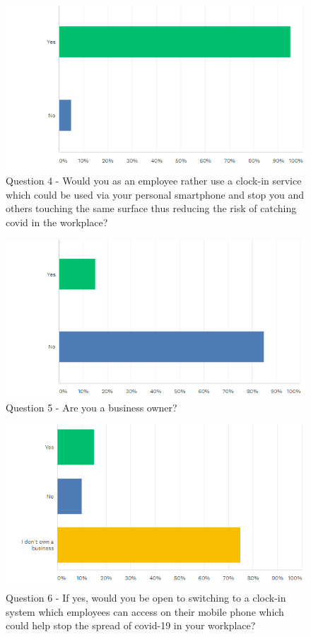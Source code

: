\begin{figure}[h]
    \includegraphics[width=1\textwidth]{img/Q4.png}
    \caption{Question 4 - Would you as an employee rather use a clock-in service which could be used via your personal smartphone and stop you and others touching the same surface thus reducing the risk of catching covid in the workplace?}
    \label{fig}
\end{figure}
\begin{figure}[h]
    \includegraphics[width=1\textwidth]{img/Q5.png}
    \caption{Question 5 - Are you a business owner?}
    \label{fig}
\end{figure}
\begin{figure}[h]
    \includegraphics[width=1\textwidth]{img/Q6.png}
    \caption{Question 6 - If yes, would you be open to switching to a clock-in system which employees can access on their mobile phone which could help stop the spread of covid-19 in your workplace?}
    \label{fig}
\end{figure}
